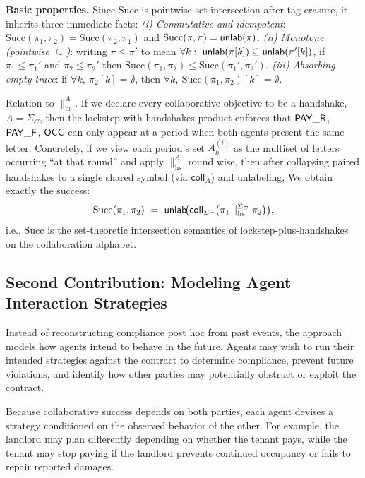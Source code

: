 \documentclass{article}
\begin{document}
  \noindent\textbf{Basic properties.}
  Since \(\mathrm{Succ}\) is pointwise set intersection after tag erasure,
  it inherits three immediate facts:
  \emph{(i) Commutative and idempotent}:
  \(\mathrm{Succ}(\pi_1,\pi_2)=\mathrm{Succ}(\pi_2,\pi_1)\) and
  \(\mathrm{Succ}(\pi,\pi)=\mathsf{unlab}(\pi)\).
  \emph{(ii) Monotone (pointwise \(\subseteq\))}: writing
  \(\pi\le\pi'\) to mean
  \(\forall k:\ \unlab(\pi[k])\subseteq\unlab(\pi'[k])\),
  if \(\pi_1\le\pi_1'\) and \(\pi_2\le\pi_2'\) then
  \(\mathrm{Succ}(\pi_1,\pi_2)\le \mathrm{Succ}(\pi_1',\pi_2')\).
  \emph{(iii) Absorbing empty trace}:
  if \(\forall k,\ \pi_2[k]=\emptyset\),
  then \(\forall k,\ \mathrm{Succ}(\pi_1,\pi_2)[k]=\emptyset\).
  
  \begin{remark}{Relation to \(\parallel_{\mathrm{hs}}^{A}\).}
  If we declare every collaborative objective to be a handshake,
  \(A=\Sigma_C\), then the lockstep-with-handshakes product enforces that
  \(\mathsf{PAY\_R}\), \(\mathsf{PAY\_F}\), \(\mathsf{OCC}\) can only appear at a period when both agents
  present the same letter. Concretely, if we view each period’s set
  \(A^{(i)}_k\) as the multiset of letters occurring “at that round” and apply
  \(\parallel_{\mathrm{hs}}^{A}\) round wise, then after collapsing paired
  handshakes to a single shared symbol (via \(\mathsf{coll}_A\)) and unlabeling,
  We obtain exactly the success:
  \[
  \mathrm{Succ}(\pi_1,\pi_2)
  \ =\
  \mathsf{unlab}\!\big(\mathsf{coll}_{\Sigma_C}\big(\pi_1\parallel_{\mathrm{hs}}^{\Sigma_C}\pi_2\big)\big),
  \]
  i.e., \(\mathrm{Succ}\) is the set-theoretic intersection semantics of
  lockstep-plus-handshakes on the collaboration alphabet.    
  \end{remark}
  
  \subsection{Second Contribution: Modeling Agent Interaction Strategies}
  Instead of reconstructing compliance post hoc from past events, the approach models how agents intend to behave in the future. Agents may wish to run their intended strategies against the contract to determine compliance, prevent future violations, and identify how other parties may potentially obstruct or exploit the contract.
  
  Because collaborative success depends on both parties, each agent devises a strategy conditioned on the observed behavior of the other. For example, the landlord may plan differently depending on whether the tenant pays, while the tenant may stop paying if the landlord prevents continued occupancy or fails to repair reported damages.
  
\end{document}
